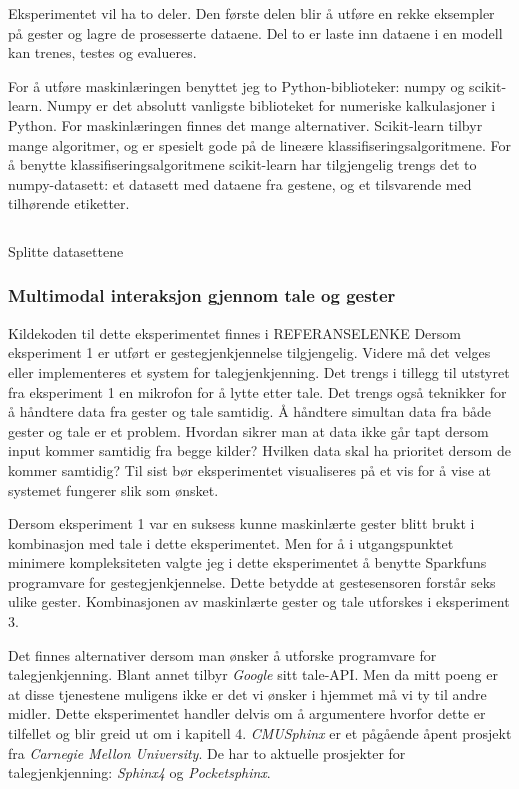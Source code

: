 Eksperimentet vil ha to deler. Den første delen blir å utføre en rekke eksempler på gester og lagre de prosesserte dataene. Del to er laste inn dataene i en modell kan trenes, testes og evalueres.  

For å utføre maskinlæringen benyttet jeg to Python-biblioteker: numpy og scikit-learn. Numpy er det absolutt vanligste biblioteket for numeriske kalkulasjoner i Python. For maskinlæringen finnes det mange alternativer. Scikit-learn tilbyr mange algoritmer, og er spesielt gode på de lineære klassifiseringsalgoritmene. For å benytte klassifiseringsalgoritmene scikit-learn har tilgjengelig trengs det to numpy-datasett: et datasett med dataene fra gestene, og et tilsvarende med tilhørende etiketter.

\begin{listing}[ht]
\inputminted[fontsize=\footnotesize]{python}{kodesnutter/split_data.py}
\label{code:split}
\caption{Splitte datasettene}
\end{listing}

\subsubsection{Multimodal interaksjon gjennom tale og gester}
{\color{red}Kildekoden til dette eksperimentet finnes i REFERANSELENKE}
Dersom eksperiment 1 er utført er gestegjenkjennelse tilgjengelig. Videre må det velges eller implementeres et system for talegjenkjenning. Det trengs i tillegg til utstyret fra eksperiment 1 en mikrofon for å lytte etter tale. Det trengs også teknikker for å håndtere data fra gester og tale samtidig. Å håndtere simultan data fra både gester og tale er et problem. Hvordan sikrer man at data ikke går tapt dersom input kommer samtidig fra begge kilder? Hvilken data skal ha prioritet dersom de kommer samtidig? Til sist bør eksperimentet visualiseres på et vis for å vise at systemet fungerer slik som ønsket.

Dersom eksperiment 1 var en suksess kunne maskinlærte gester blitt brukt i kombinasjon med tale i dette eksperimentet. Men for å i utgangspunktet minimere kompleksiteten valgte jeg i dette eksperimentet å benytte Sparkfuns programvare for gestegjenkjennelse. Dette betydde at gestesensoren forstår seks ulike gester. Kombinasjonen av maskinlærte gester og tale utforskes i eksperiment 3.

Det finnes alternativer dersom man ønsker å utforske programvare for talegjenkjenning. Blant annet tilbyr \emph{Google} sitt tale-API. Men da mitt poeng er at disse tjenestene muligens ikke er det vi ønsker i hjemmet må vi ty til andre midler. Dette eksperimentet handler delvis om å argumentere hvorfor dette er tilfellet og blir greid ut om i kapitell 4. \emph{CMUSphinx} er et pågående åpent prosjekt fra \emph{Carnegie Mellon University}. De har to aktuelle prosjekter for talegjenkjenning: \emph{Sphinx4} og \emph{Pocketsphinx}.

